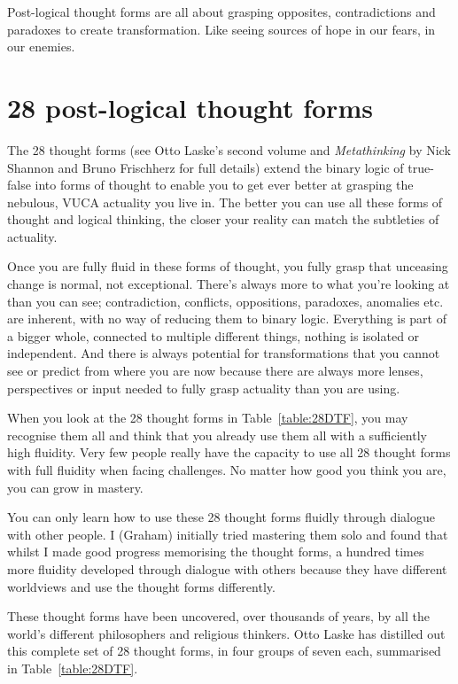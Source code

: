 Post-logical thought forms are all about grasping opposites, contradictions and paradoxes to create transformation. Like seeing sources of hope in our fears, in our enemies.


\section{28 post-logical thought forms}
\label{section:dtf-description} 


The 28 thought forms (see Otto Laske's second volume\cite{laske-vol2} and \emph{Metathinking}\cite{shannon-metathinking} by Nick Shannon and Bruno Frischherz for full details) extend the binary logic of true-false into forms of thought to enable you to get ever better at grasping the nebulous, VUCA actuality you live in. The better you can use all these forms of thought and logical thinking, the closer your reality can match the subtleties of actuality. 


Once you are fully fluid in these forms of thought, you fully grasp that unceasing change is normal, not exceptional. There's always more to what you're looking at than you can see; contradiction, conflicts, oppositions, paradoxes, anomalies etc. are inherent, with no way of reducing them to binary logic. Everything is part of a bigger whole, connected to multiple different things, nothing is isolated or independent. And there is always potential for transformations that you cannot see or predict from where you are now because there are always more lenses, perspectives or input needed to fully grasp actuality than you are using.


When you look at the 28 thought forms in Table~\ref{table:28DTF}, you may recognise them all and think that you already use them all with a sufficiently high fluidity. Very few people really have the capacity to use all 28 thought forms with full fluidity when facing challenges. No matter how good you think you are, you can grow in mastery.


You can only learn how to use these 28 thought forms fluidly through dialogue with other people. I (Graham) initially tried mastering them solo and found that whilst I made good progress memorising the thought forms, a hundred times more fluidity developed through dialogue with others because they have different worldviews and use the thought forms differently.


These thought forms have been uncovered, over thousands of years, by all the world's different philosophers and religious thinkers. Otto Laske has distilled out this complete set of 28 thought forms, in four groups of seven each, summarised in Table~\ref{table:28DTF}.


